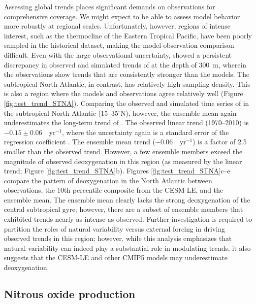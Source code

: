 \documentclass{report_chapter}
\begin{document}
Assessing global trends places significant demands on observations for comprehensive coverage.
We might expect to be able to assess model behavior more robustly at regional scales.
Unfortunately, however, regions of intense interest, such as the thermocline of the Eastern Tropical Pacific, have been poorly sampled in the historical dataset, making the model-observation comparison difficult.
Even with the large observational uncertainty, \citet{Oschlies-Duteil-etal-2017} showed a persistent discrepancy in observed and simulated trends of \OO{} at the depth of 300~m, wherein the observations show trends that are consistently stronger than the models.
The subtropical North Atlantic, in contrast, has relatively high sampling density.
This is also a region where the models and observations agree relatively well (Figure \ref{fig:test_trend_STNA}).
Comparing the observed and simulated time series of \OO{} in the subtropical North Atlantic (15--35$^\circ$N), however, the ensemble mean again underestimates the long-term trend of \OO{}.
The observed linear trend (1970--2010) is $-0.15\pm0.06$~\mmolmmm{}~yr$^{-1}$, where the uncertainty again is a standard error of the regression coefficient \citep{Santer-Mears-etal-2011}.
The ensemble mean trend ($-0.06$~\mmolmmm{}~yr$^{-1}$) is a factor of 2.5 smaller than the observed trend.
However, a few ensemble members exceed the magnitude of observed deoxygenation in this region (as measured by the linear trend; Figure \ref{fig:test_trend_STNA}b).
Figures \ref{fig:test_trend_STNA}c--e compare the pattern of deoxygenation in the North Atlantic between observations, the 10th percentile composite from the CESM-LE, and the ensemble mean.
The ensemble mean clearly lacks the strong deoxygenation of the central subtropical gyre; however, there are a subset of ensemble members that exhibited trends nearly as intense as observed.
Further investigation is required to partition the roles of natural variability versus external forcing in driving observed \OO{} trends in this region; however, while this analysis emphasizes that natural variability can indeed play a substantial role in modulating trends, it also suggests that the CESM-LE and other CMIP5 models may underestimate deoxygenation.

\subsection{Nitrous oxide production}\label{loc:n2o}
\end{document}
